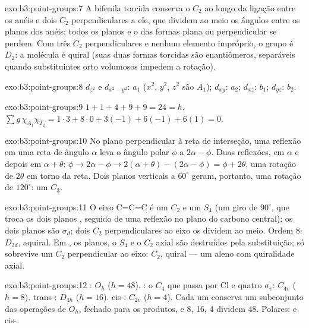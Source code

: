 \begin{solution}{exo:b3:point-groups:7}
A bifenila torcida conserva o $C_2$ ao longo da ligação entre os anéis e dois $C_2$
perpendiculares a ele, que dividem ao meio os ângulos entre os planos dos anéis;
todos os planos e o  das formas plana ou perpendicular se
perdem. Com três $C_2$ perpendiculares e nenhum elemento impróprio, o grupo é
$D_2$: a molécula é quiral (suas duas formas torcidas são enantiômeros,
separáveis quando substituintes orto volumosos impedem a rotação).
\end{solution}

\begin{solution}{exo:b3:point-groups:8}
$d_{z^2}$ e $d_{x^2-y^2}$: $a_1$ ($x^2$, $y^2$, $z^2$ são $A_1$); $d_{xy}$: $a_2$; $d_{xz}$:
$b_1$; $d_{yz}$: $b_2$.
\end{solution}

\begin{solution}{exo:b3:point-groups:9}
$1 + 1 + 4 + 9 + 9 = 24 = h$. $\sum g\,\chi_{A_1}\chi_{T_2} = 1\cdot3 + 8\cdot0 + 3(-1)
+ 6(-1) + 6(1) = 0$.
\end{solution}

\begin{solution}{exo:b3:point-groups:10}
No plano perpendicular à reta de interseção, uma reflexão em uma reta
de ângulo $\alpha$ leva o ângulo polar $\phi$ a $2\alpha - \phi$. Duas reflexões, em
$\alpha$ e depois em $\alpha + \theta$: $\phi \to 2\alpha - \phi \to 2(\alpha + \theta) - (2\alpha - \phi) =
\phi + 2\theta$, uma rotação de $2\theta$ em torno da reta. Dois planos verticais a
$60^\circ$ geram, portanto, uma rotação de $120^\circ$: um $C_3$.
\end{solution}

\begin{solution}{exo:b3:point-groups:11}
O eixo C=C=C é um $C_2$ e um $S_4$ (um giro de $90^\circ$, que troca os dois
planos , seguido de uma reflexão no plano do carbono central); os dois
planos  são $\sigma_d$; dois $C_2$ perpendiculares ao eixo os dividem ao meio.
Ordem 8: $D_{2d}$, aquiral. Em , os planos, o $S_4$ e o $C_2$
axial são destruídos pela substituição; só sobrevive um $C_2$ perpendicular ao
eixo: $C_2$, quiral --- um aleno com quiralidade axial.
\end{solution}

\begin{solution}{exo:b3:point-groups:12}
: $O_h$ ($h = 48$). : o $C_4$ que passa por Cl e quatro $\sigma_v$:
$C_{4v}$ ($h = 8$). trans-: $D_{4h}$ ($h = 16$). cis-: $C_{2v}$ ($h
= 4$). Cada um conserva um subconjunto das operações de $O_h$, fechado para os
produtos, e 8, 16, 4 dividem 48. Polares:  e cis-.
\end{solution}

